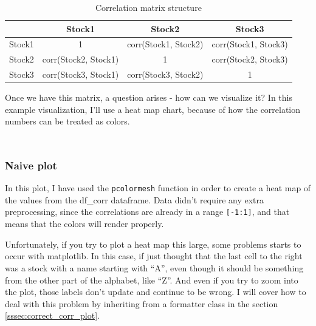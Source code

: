 \documentclass[12pt, a4paper]{article}
\begin{document}
\begin{table}[h!]
\centering
\caption{Correlation matrix structure}
\begin{tabular}{ | c | c | c | c | }
  \hline
  \ & Stock1 & Stock2 & Stock3 \\
  \hline
  Stock1 & 1 & corr(Stock1, Stock2) & corr(Stock1, Stock3) \\
  \hline
  Stock2 & corr(Stock2, Stock1) & 1 & corr(Stock2, Stock3) \\
  \hline
  Stock3 & corr(Stock3, Stock1) & corr(Stock3, Stock2) & 1 \\
  \hline
\end{tabular}
\label{table:corr}
\end{table}

Once we have this matrix, a question arises - how can we visualize it? In this example visualization, I'll use a heat map chart, because of how the correlation numbers can be treated as colors.

\bgroup
  \inputminted[linenos, breaklines=true, fontsize=\scriptsize]{python}{src/stocks/corr/0_imports.py}
  \label{listing:scorr_0_imports}
\egroup

\bgroup
  \inputminted[linenos, breaklines=true, fontsize=\scriptsize, firstnumber=last]{python}{src/stocks/corr/1_get_data.py}
  \label{listing:scorr_1}
\egroup

\subsubsection{Naive plot}

In this plot, I have used the \texttt{pcolormesh} function in order to create a heat map of the values from the df\_corr dataframe. Data didn’t require any extra preprocessing, since the correlations are already in a range \texttt{[-1:1]}, and that means that the colors will render properly.

Unfortunately, if you try to plot a heat map this large, some problems starts to occur with matplotlib. In this case, if just thought that the last cell to the right was a stock with a name starting with “A”, even though it should be something from the other part of the alphabet, like “Z”. And even if you try to zoom into the plot, those labels don’t update and continue to be wrong. I will cover how to deal with this problem by inheriting from a formatter class in the section \ref{sssec:correct_corr_plot}.
\end{document}
